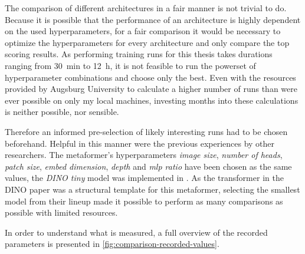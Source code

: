 The comparison of different architectures in a fair manner is not trivial to do.
Because it is possible that the performance of an architecture is highly dependent on the used hyperparameters, for a fair comparison it would be necessary to optimize the hyperparameters for every architecture and only compare the top scoring results.
As performing training runs for this thesis takes durations ranging from \SI[]{30}[]{\minute} to \SI[]{12}[]{\hour}, it is not feasible to run the powerset of hyperparameter combinations and choose only the best.
Even with the resources provided by Augsburg University to calculate a higher number of runs than were ever possible on only my local machines, investing months into these calculations is neither possible, nor sensible.

Therefore an informed pre-selection of likely interesting runs had to be chosen beforehand.
Helpful in this manner were the previous experiences by other researchers. 
The metaformer's hyperparameters \emph{image size}, \emph{number of heads}, \emph{patch size}, \emph{embed dimension}, \emph{depth} and \emph{mlp ratio} have been chosen as the same values, the \emph{DINO tiny} model was implemented in \cite{dinoGithub}. As the transformer in the DINO paper \cite{dinoPaper} was a structural template for this metaformer, selecting the smallest model from their lineup made it possible to perform as many comparisons as possible with limited resources.

In order to understand what is measured, a full overview of the recorded parameters is presented in \autoref{fig:comparison-recorded-values}.

